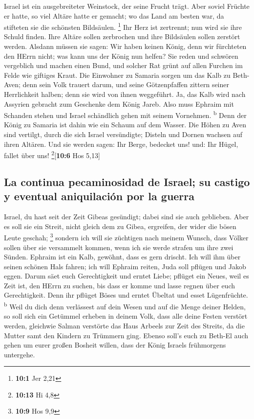 Israel ist ein ausgebreiteter Weinstock, der seine Frucht
trägt. Aber soviel Früchte er hatte, so viel Altäre hatte er gemacht; wo
das Land am besten war, da stifteten sie die schönsten Bildsäulen.
\footnote{\textbf{10:1} Jer 2,21}  Ihr Herz ist zertrennt;
nun wird sie ihre Schuld finden. Ihre Altäre sollen zerbrochen und ihre
Bildsäulen sollen zerstört werden.  Alsdann müssen sie
sagen: Wir haben keinen König, denn wir fürchteten den HErrn nicht; was
kann uns der König nun helfen?  Sie reden und schwören
vergeblich und machen einen Bund, und solcher Rat grünt auf allen
Furchen im Felde wie giftiges Kraut.  Die Einwohner zu
Samaria sorgen um das Kalb zu Beth-Aven; denn sein Volk trauert darum,
und seine Götzenpfaffen zittern seiner Herrlichkeit halben; denn sie
wird von ihnen weggeführt.  Ja, das Kalb wird nach
Assyrien gebracht zum Geschenke dem König Jareb. Also muss Ephraim mit
Schanden stehen und Israel schändlich gehen mit seinem Vornehmen.
\textsuperscript{b}  Denn der König zu Samaria ist dahin
wie ein Schaum auf dem Wasser.  Die Höhen zu Aven sind
vertilgt, durch die sich Israel versündigte; Disteln und Dornen wachsen
auf ihren Altären. Und sie werden sagen: Ihr Berge, bedecket uns! und:
Ihr Hügel, fallet über uns! \footnote{\textbf{10:13} Hi 4,8}{[}\textbf{10:6}
Hos 5,13{]}

\hypertarget{la-continua-pecaminosidad-de-israel-su-castigo-y-eventual-aniquilaciuxf3n-por-la-guerra}{%
\subsection{La continua pecaminosidad de Israel; su castigo y eventual
aniquilación por la
guerra}\label{la-continua-pecaminosidad-de-israel-su-castigo-y-eventual-aniquilaciuxf3n-por-la-guerra}}

 Israel, du hast seit der Zeit Gibeas gesündigt; dabei
sind sie auch geblieben. Aber es soll sie ein Streit, nicht gleich dem
zu Gibea, ergreifen, der wider die bösen Leute geschah; \footnote{\textbf{10:9}
  Hos 9,9}  sondern ich will sie züchtigen nach meinem
Wunsch, dass Völker sollen über sie versammelt kommen, wenn ich sie
werde strafen um ihre zwei Sünden.  Ephraim ist ein Kalb,
gewöhnt, dass es gern drischt. Ich will ihm über seinen schönen Hals
fahren; ich will Ephraim reiten, Juda soll pflügen und Jakob eggen.
 Darum säet euch Gerechtigkeit und erntet Liebe; pflüget
ein Neues, weil es Zeit ist, den HErrn zu suchen, bis dass er komme und
lasse regnen über euch Gerechtigkeit.  Denn ihr pflüget
Böses und erntet Übeltat und esset Lügenfrüchte. \textsuperscript{b}
 Weil du dich denn verlässest auf dein Wesen und auf die
Menge deiner Helden, so soll sich ein Getümmel erheben in deinem Volk,
dass alle deine Festen verstört werden, gleichwie Salman verstörte das
Haus Arbeels zur Zeit des Streits, da die Mutter samt den Kindern zu
Trümmern ging.  Ebenso soll's euch zu Beth-El auch gehen
um eurer großen Bosheit willen, dass der König Israels frühmorgens
untergehe.

